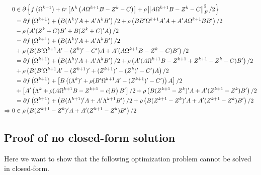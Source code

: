 \documentclass[11pt,]{report}
\theoremstyle{definition}
\theoremstyle{definition}
\theoremstyle{definition}
\theoremstyle{remark}
\begin{document}
\begin{equation}
\begin{split}
  0 &\in \partial \left\{ f\left(\Omega^{k + 1}\right) + tr\left[ \Lambda^{k}\left( A\Omega^{k + 1}B - Z^{k} - C \right) \right] + \rho\left\| A\Omega^{k + 1}B - Z^{k} - C \right\|_{F}^{2}/2 \right\} \\
  &= \partial f\left(\Omega^{k + 1} \right) + \left(B(\Lambda^{k})'A + A'\Lambda^{k}B' \right)/2 + \rho\left( BB'\Omega^{k + 1}A'A + A'A\Omega^{k + 1}BB' \right)/2 \\
  &- \rho\left( A'(Z^{k} + C)B' + B(Z^{k} + C)'A \right)/2 \\
  &= \partial f\left(\Omega^{k + 1} \right) + \left(B(\Lambda^{k})'A + A'\Lambda^{k}B' \right)/2 \\
  &+ \rho\left( B(B'\Omega^{k + 1}A' - (Z^{k})' - C')A + A'(A\Omega^{k + 1}B - Z^{k} - C)B' \right)/2 \\
  &= \partial f\left(\Omega^{k + 1} \right) + \left( B(\Lambda^{k})'A + A'\Lambda^{k}B' \right)/2 + \rho\left(A'(A\Omega^{k + 1}B - Z^{k + 1} + Z^{k + 1} - Z^{k} - C)B' \right)/2 \\
  &+ \rho\left(B(B'\Omega^{k + 1}A' - (Z^{k + 1})' + (Z^{k + 1})' - (Z^{k})' - C')A \right)/2 \\
  &= \partial f\left(\Omega^{k + 1} \right) + \left[ B\left((\Lambda^{k})' + \rho(B'\Omega^{k + 1}A' - (Z^{k + 1})' - C') \right)A \right]/2 \\
  &+ \left[ A'\left(\Lambda^{k} + \rho(A\Omega^{k + 1}B - Z^{k + 1} - c)B \right)B' \right]/2 + \rho\left(B(Z^{k + 1} - Z^{k})'A + A'(Z^{k + 1} - Z^{k})B' \right)/2 \\
  &= \partial f\left(\Omega^{k + 1} \right) + \left(B(\Lambda^{k + 1})'A + A'\Lambda^{k + 1}B' \right)/2 + \rho\left(B(Z^{k + 1} - Z^{k})'A + A'(Z^{k + 1} - Z^{k})B' \right)/2 \\
  \Rightarrow 0 &\in \rho\left( B(Z^{k + 1} - Z^{k})'A + A'(Z^{k + 1} - Z^{k})B' \right)/2
\end{split}
\label{eq:appendixstopproof}\notag
\end{equation}

\hypertarget{proofpenregression}{%
\subsection{Proof of no closed-form solution}\label{proofpenregression}}

Here we want to show that the following optimization problem cannot be solved in closed-form.
\end{document}
